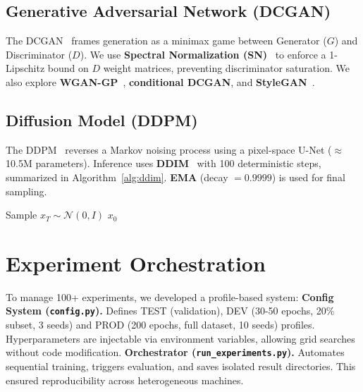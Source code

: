 \documentclass[runningheads]{llncs}
\begin{document}
\subsection{Generative Adversarial Network (DCGAN)}
The DCGAN~\cite{radford2015} frames generation as a minimax game between Generator ($G$) and Discriminator ($D$). We use \textbf{Spectral Normalization (SN)}~\cite{miyato2018} to enforce a 1-Lipschitz bound on $D$ weight matrices, preventing discriminator saturation. We also explore \textbf{WGAN-GP}~\cite{gulrajani2017}, \textbf{conditional DCGAN}, and \textbf{StyleGAN}~\cite{karras2018}.

\subsection{Diffusion Model (DDPM)}
The DDPM~\cite{ho2020} reverses a Markov noising process using a pixel-space U-Net ($\approx$10.5M parameters). Inference uses \textbf{DDIM}~\cite{song2020} with 100 deterministic steps, summarized in Algorithm~\ref{alg:ddim}. \textbf{EMA} (decay $=0.9999$) is used for final sampling.

\begin{algorithm}[htbp]
\DontPrintSemicolon
\SetAlgoLined
{}
Sample $x_T \sim \mathcal{N}(0,I)$\;
\Return $x_0$\;
\caption{DDIM Sampling (Deterministic)}
\label{alg:ddim}
\end{algorithm}

\section{Experiment Orchestration}\label{sec:engineering}

To manage 100+ experiments, we developed a profile-based system:
\noindent\textbf{Config System (\texttt{config.py}).} Defines TEST (validation), DEV (30-50 epochs, 20\% subset, 3 seeds) and PROD (200 epochs, full dataset, 10 seeds) profiles. Hyperparameters are injectable via environment variables, allowing grid searches without code modification.
\noindent\textbf{Orchestrator (\texttt{run\_experiments.py}).} Automates sequential training, triggers evaluation, and saves isolated result directories. This ensured reproducibility across heterogeneous machines.
\end{document}
